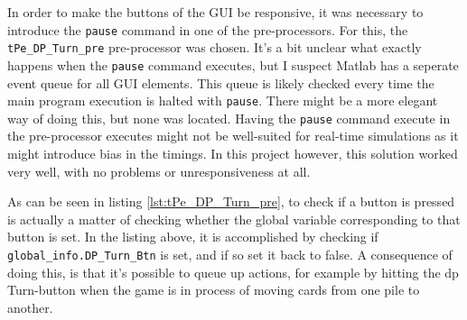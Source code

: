 \documentclass[runningheads,a4paper]{llncs}
\newcommand{\GPenSIM}{../GPenSIM}
\begin{document}
In order to make the buttons of the GUI be responsive, it was necessary to introduce the \verb!pause! command in one of the pre-processors. For this, the \verb!tPe_DP_Turn_pre! pre-processor was chosen. It's a bit unclear what exactly happens when the \verb!pause! command executes, but I suspect Matlab has a seperate event queue for all GUI elements. This queue is likely checked every time the main program execution is halted with \verb!pause!. There might be a more elegant way of doing this, but none was located. Having the \verb!pause! command execute in the pre-processor executes might not be well-suited for real-time simulations as it might introduce bias in the timings. In this project however, this solution worked very well, with no problems or unresponsiveness at all.


As can be seen in listing \ref{lst:tPe_DP_Turn_pre}, to check if a button is pressed is actually a matter of checking whether the global variable corresponding to that button is set. In the listing above, it is accomplished by checking if \verb!global_info.DP_Turn_Btn! is set, and if so set it back to false. A consequence of doing this, is that it's possible to queue up actions, for example by hitting the \ac{dp} Turn-button when the game is in process of moving cards from one pile to another. \\
\end{document}
